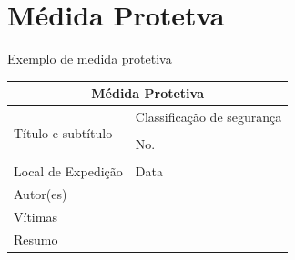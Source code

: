 \documentclass[
	12pt,				%
    oneside,			%
	a4paper,			%
	english,			%
	french,				%
	spanish,			%
	brazil,				%
	]{abntex2}
\begin{document}
\printglossaries


\begin{apendicesenv}

\partapendices




\end{apendicesenv}




\printindex

\chapter*[Médida Protetva]{Médida Protetva}
\label{formulado-identificacao}

Exemplo de medida protetiva

\bigskip

\begin{tabular}{|p{9cm}|p{5cm}|} %
\hline
\multicolumn{2}{|c|}{\textbf{\large Médida Protetiva}}\\
\hline
\multirow{4}{10cm}[24pt]{Título e subtítulo}& Classificação de segurança\\
                   & \\
                   \cline{2-2}
                   & No.\\
                   & \\
				
\hline
Local de Expedição & Data\\

\hline
\multicolumn{2}{|l|}{Autor(es)} \\

\hline
\multicolumn{2}{|l|}{Vítimas} \\
\hline
\multicolumn{2}{|l|}{Resumo}\\[3cm]
\hline

\end{tabular}
\end{document}
